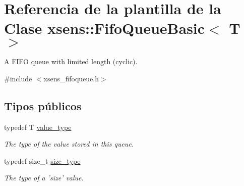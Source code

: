 \hypertarget{classxsens_1_1FifoQueueBasic}{\section{\-Referencia de la plantilla de la \-Clase xsens\-:\-:\-Fifo\-Queue\-Basic$<$ \-T $>$}
\label{classxsens_1_1FifoQueueBasic}
}


\-A \-F\-I\-F\-O queue with limited length (cyclic).  




{\ttfamily \#include $<$xsens\-\_\-fifoqueue.\-h$>$}

\subsection*{\-Tipos públicos}
\begin{DoxyCompactItemize}
\item 
\hypertarget{classxsens_1_1FifoQueueBasic_a4952f1bac21ff075e2b7667cbca0cd0e}{typedef \-T \hyperlink{classxsens_1_1FifoQueueBasic_a4952f1bac21ff075e2b7667cbca0cd0e}{value\-\_\-type}}\label{classxsens_1_1FifoQueueBasic_a4952f1bac21ff075e2b7667cbca0cd0e}

\begin{DoxyCompactList}\small\item\em \-The type of the value stored in this queue. \end{DoxyCompactList}\item 
\hypertarget{classxsens_1_1FifoQueueBasic_abef5a7d633ee8b57a33360bf3b3efdef}{typedef size\-\_\-t \hyperlink{classxsens_1_1FifoQueueBasic_abef5a7d633ee8b57a33360bf3b3efdef}{size\-\_\-type}}\label{classxsens_1_1FifoQueueBasic_abef5a7d633ee8b57a33360bf3b3efdef}

\begin{DoxyCompactList}\small\item\em \-The type of a 'size' value. \end{DoxyCompactList}\end{DoxyCompactItemize}
